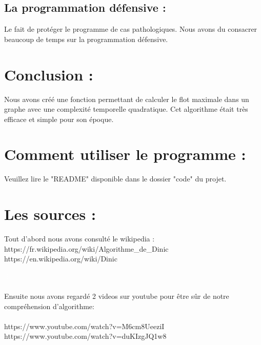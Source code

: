 \documentclass[a4paper, 11pt, oneside]{article}
\begin{document}
\subsection{La programmation défensive :}
Le fait de protéger le programme de cas pathologiques. Nous avons du consacrer beaucoup de temps sur la programmation défensive.

\section{\textbf{Conclusion :}}
Nous avons créé une fonction permettant de calculer le flot maximale dans un graphe avec une complexité temporelle quadratique. Cet algorithme était très efficace et simple pour son époque.

\section{\textbf{Comment utiliser le programme :}}
Veuillez lire le "README" disponible dans le dossier "code" du projet.

\section{\textbf{Les sources :}}

Tout d'abord nous avons consulté le wikipedia :\\
https://fr.wikipedia.org/wiki/Algorithme\_de\_Dinic\\
https://en.wikipedia.org/wiki/Dinic%

\textcolor{white}{\vdots}\\\\
Ensuite nous avons regardé 2 videos sur youtube pour être sûr de notre compréhension d'algorithme:\\\\
https://www.youtube.com/watch?v=M6cm8UeeziI\\
https://www.youtube.com/watch?v=duKIzgJQ1w8\\
\end{document}
